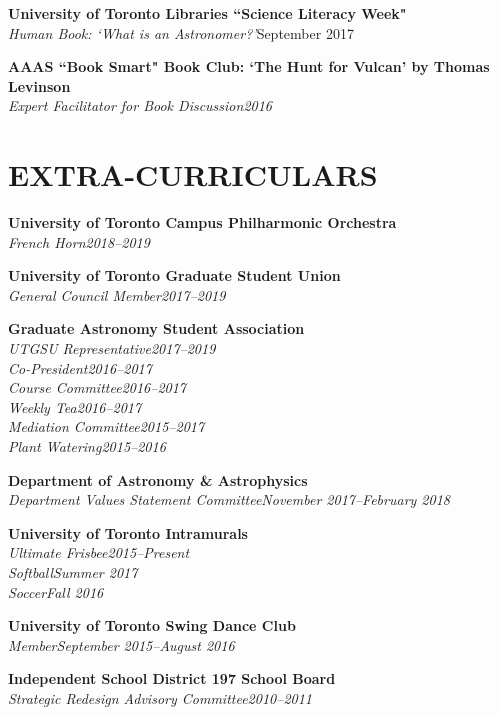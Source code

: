 \documentclass[10pt]{res} %
\begin{document}
\begin{resume}
\textbf{University of Toronto Libraries ``Science Literacy Week"}\\
{\sl Human Book: `What is an Astronomer?'}\hfill{September 2017}

\textbf{AAAS ``Book Smart" Book Club: `The Hunt for Vulcan' by Thomas Levinson}\\
{\sl Expert Facilitator for Book Discussion}\hfill{\sl 2016}

\section{EXTRA-CURRICULARS} 
% 
 \textbf{University of Toronto Campus Philharmonic Orchestra}\\
{\sl French Horn}\hfill{\sl 2018--2019}

\textbf{University of Toronto Graduate Student Union}\\
{\sl General Council Member}\hfill{\sl 2017--2019}

\textbf{Graduate Astronomy Student Association}\\
{\sl UTGSU Representative}\hfill{\sl 2017--2019}\\
{\sl Co-President}\hfill{\sl 2016--2017}\\
{\sl Course Committee}\hfill{\sl 2016--2017}\\
{\sl Weekly Tea}\hfill{\sl 2016--2017}\\
{\sl Mediation Committee}\hfill{\sl 2015--2017}\\
{\sl Plant Watering}\hfill{\sl 2015--2016}

\textbf{Department of Astronomy \& Astrophysics}\\
{\sl Department Values Statement Committee}\hfill{\sl November 2017--February 2018}

\textbf{University of Toronto Intramurals}\\
{\sl Ultimate Frisbee}\hfill{\sl 2015--Present}\\
{\sl Softball}\hfill{\sl Summer 2017}\\
{\sl Soccer}\hfill{\sl Fall 2016}

\textbf{University of Toronto Swing Dance Club}\\
{\sl Member}\hfill{\sl September 2015--August 2016}

\textbf{Independent School District 197 School Board}\\
{\sl Strategic Redesign Advisory Committee}\hfill{\sl 2010--2011}


\end{resume}
\end{document}
